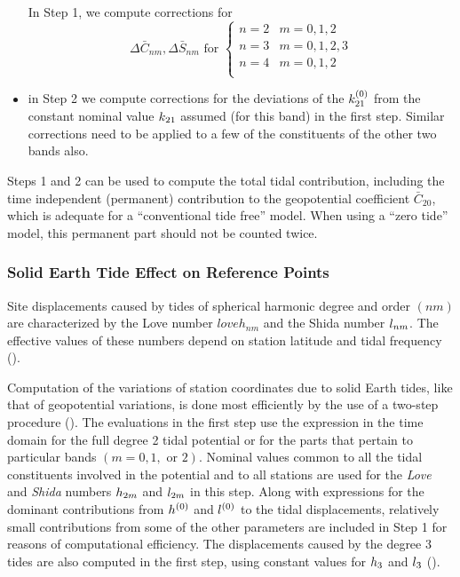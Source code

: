 \begin{itemize}
    In Step 1, we compute corrections for 
    \begin{equation}
      \Delta \bar{C}_{nm}, \Delta \bar{S}_{nm} \text{ for }
        \begin{cases}
          n=2 & m=0,1,2 \\
          n=3 & m=0,1,2,3 \\
          n=4 & m=0,1,2\\
        \end{cases}
    \end{equation} 

  \item in Step 2 we compute corrections for the deviations of the 
  $k ^{(0)}_{21}$ from the constant nominal value $k _{21}$ 
  assumed (for this band) in the first step. Similar corrections need to be 
  applied to a few of the constituents of the other two bands also.
\end{itemize}

Steps 1 and 2 can be used to compute the total tidal contribution, including 
the time independent (permanent) contribution to the geopotential coefficient 
$\bar{C}_{20}$, which is adequate for a ``conventional tide free'' model. 
When using a ``zero tide'' model, this permanent part should not be counted 
twice.

\subsubsection{Solid Earth Tide Effect on Reference Points}
\label{sssec:solid-earth-tide-reference-points}

Site displacements caused by tides of spherical harmonic degree and order $(nm)$ 
are characterized by the Love number $loveh _{nm}$ and the Shida number $l _{nm}$. 
The effective values of these numbers depend on station latitude and tidal 
frequency (\cite{WahrEtAl1981}).

Computation of the variations of station coordinates due to solid Earth tides, 
like that of geopotential variations, is done most efficiently by the use of a 
two-step procedure (\cite{iers2010}). The evaluations in the first step use 
the expression in the time domain for the full degree 2 tidal potential or for 
the parts that pertain to particular bands $(m = 0, 1, \text{ or } 2)$. Nominal 
values common to all the tidal constituents involved in the potential and to 
all stations are used for the \emph{Love} and \emph{Shida} numbers $h _{2m}$ 
and $l _{2m}$ in this step. Along with expressions for the dominant 
contributions from $h ^{(0)}$ and $l ^{(0)}$ to the tidal displacements,
relatively small contributions from some of the other parameters are included 
in Step 1 for reasons of computational efficiency. The displacements caused by 
the degree 3 tides are also computed in the first step, using constant values 
for $h _3$ and $l _3$ (\cite{iers2010}).

